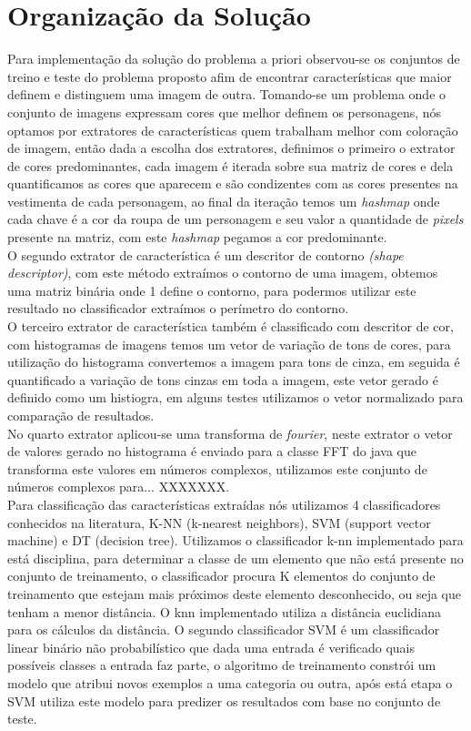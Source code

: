 \documentclass[12pt]{article}
\begin{document}
\section{Organização da Solução}\label{sec:solucao}

	Para implementação da solução do problema a priori observou-se os conjuntos de treino e teste do problema proposto afim de encontrar características que maior definem e distinguem uma imagem de outra. Tomando-se um problema onde o conjunto de imagens expressam cores que melhor definem os personagens, nós optamos por extratores de características quem trabalham melhor com coloração de imagem, então dada a escolha dos extratores, definimos o primeiro o extrator de cores predominantes, cada imagem é iterada sobre sua matriz de cores e dela quantificamos as cores que aparecem e são condizentes com as cores presentes na vestimenta de cada personagem, ao final da iteração temos um \textit{hashmap} onde cada chave é a cor da roupa de um personagem e seu valor a quantidade de \textit{pixels} presente na matriz, com este \textit{hashmap} pegamos a cor predominante.\\
	O segundo extrator de característica é um descritor de contorno \textit{(shape descriptor)}, com este método extraímos o contorno de uma imagem, obtemos uma matriz binária onde 1 define o contorno, para podermos utilizar este resultado no classificador extraímos o perímetro do contorno. \\
	O terceiro extrator de característica também é classificado com descritor de cor, com histogramas de imagens temos um vetor de variação de tons de cores, para utilização do histograma convertemos a imagem para tons de cinza, em seguida é quantificado a variação de tons cinzas em toda a imagem, este vetor gerado é definido como um histiogra, em alguns testes utilizamos o vetor normalizado para comparação de resultados.\\
	No quarto extrator aplicou-se uma transforma de \textit{fourier}, neste extrator o vetor de valores gerado no histograma é enviado para a classe FFT do java que transforma este valores em números complexos, utilizamos este conjunto de números complexos para... XXXXXXX.\\

	Para classificação das características extraídas nós utilizamos 4 classificadores conhecidos na literatura, K-NN (k-nearest neighbors), SVM (support vector machine) e DT (decision tree). Utilizamos o classificador k-nn implementado para está disciplina, para determinar a classe de um elemento que não está presente no conjunto de treinamento, o classificador procura K elementos do conjunto de treinamento que estejam mais próximos deste elemento desconhecido, ou seja que tenham a menor distância. O knn implementado utiliza a distância euclidiana para os cálculos da distância.
	O segundo classificador SVM é um classificador linear binário não probabilístico que dada uma entrada é verificado quais possíveis classes a entrada faz parte, o algoritmo de treinamento constrói um modelo que atribui novos exemplos a uma categoria ou outra, após está etapa o SVM utiliza este modelo para predizer os resultados com base no conjunto de teste.
\end{document}
